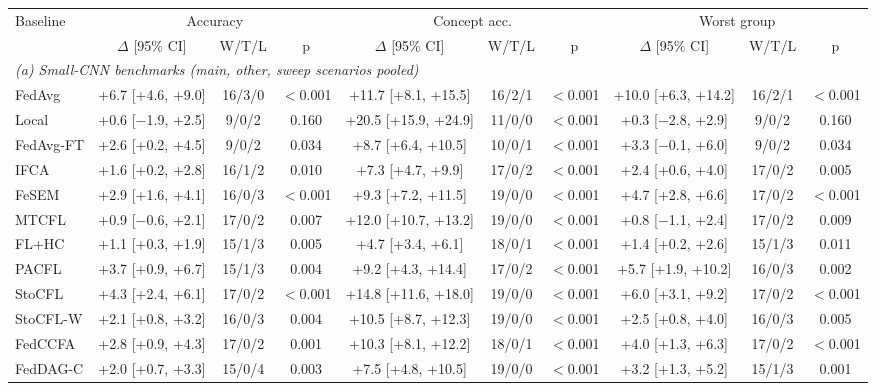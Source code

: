 {\scriptsize
\begin{tabular}{l c c c c c c c c c}
\toprule
Baseline & \multicolumn{3}{c}{Accuracy} & \multicolumn{3}{c}{Concept acc.} & \multicolumn{3}{c}{Worst group} \\
\cmidrule(lr){2-4}
\cmidrule(lr){5-7}
\cmidrule(lr){8-10}
 & $\Delta$ [95\% CI] & W/T/L & p & $\Delta$ [95\% CI] & W/T/L & p & $\Delta$ [95\% CI] & W/T/L & p \\
\midrule
\multicolumn{10}{l}{\textit{(a) Small-CNN benchmarks (main, other, sweep scenarios pooled)}} \\
FedAvg & +6.7 [+4.6, +9.0] & 16/3/0 & $<$0.001 & +11.7 [+8.1, +15.5] & 16/2/1 & $<$0.001 & +10.0 [+6.3, +14.2] & 16/2/1 & $<$0.001 \\
Local & +0.6 [$-$1.9, +2.5] & 9/0/2 & 0.160 & +20.5 [+15.9, +24.9] & 11/0/0 & $<$0.001 & +0.3 [$-$2.8, +2.9] & 9/0/2 & 0.160 \\
FedAvg-FT & +2.6 [+0.2, +4.5] & 9/0/2 & 0.034 & +8.7 [+6.4, +10.5] & 10/0/1 & $<$0.001 & +3.3 [$-$0.1, +6.0] & 9/0/2 & 0.034 \\
IFCA & +1.6 [+0.2, +2.8] & 16/1/2 & 0.010 & +7.3 [+4.7, +9.9] & 17/0/2 & $<$0.001 & +2.4 [+0.6, +4.0] & 17/0/2 & 0.005 \\
FeSEM & +2.9 [+1.6, +4.1] & 16/0/3 & $<$0.001 & +9.3 [+7.2, +11.5] & 19/0/0 & $<$0.001 & +4.7 [+2.8, +6.6] & 17/0/2 & $<$0.001 \\
MTCFL & +0.9 [$-$0.6, +2.1] & 17/0/2 & 0.007 & +12.0 [+10.7, +13.2] & 19/0/0 & $<$0.001 & +0.8 [$-$1.1, +2.4] & 17/0/2 & 0.009 \\
FL+HC & +1.1 [+0.3, +1.9] & 15/1/3 & 0.005 & +4.7 [+3.4, +6.1] & 18/0/1 & $<$0.001 & +1.4 [+0.2, +2.6] & 15/1/3 & 0.011 \\
PACFL & +3.7 [+0.9, +6.7] & 15/1/3 & 0.004 & +9.2 [+4.3, +14.4] & 17/0/2 & $<$0.001 & +5.7 [+1.9, +10.2] & 16/0/3 & 0.002 \\
StoCFL & +4.3 [+2.4, +6.1] & 17/0/2 & $<$0.001 & +14.8 [+11.6, +18.0] & 19/0/0 & $<$0.001 & +6.0 [+3.1, +9.2] & 17/0/2 & $<$0.001 \\
StoCFL-W & +2.1 [+0.8, +3.2] & 16/0/3 & 0.004 & +10.5 [+8.7, +12.3] & 19/0/0 & $<$0.001 & +2.5 [+0.8, +4.0] & 16/0/3 & 0.005 \\
FedCCFA & +2.8 [+0.9, +4.3] & 17/0/2 & 0.001 & +10.3 [+8.1, +12.2] & 18/0/1 & $<$0.001 & +4.0 [+1.3, +6.3] & 17/0/2 & $<$0.001 \\
FedDAG-C & +2.0 [+0.7, +3.3] & 15/0/4 & 0.003 & +7.5 [+4.8, +10.5] & 19/0/0 & $<$0.001 & +3.2 [+1.3, +5.2] & 15/1/3 & 0.001 \\

\end{tabular}}
